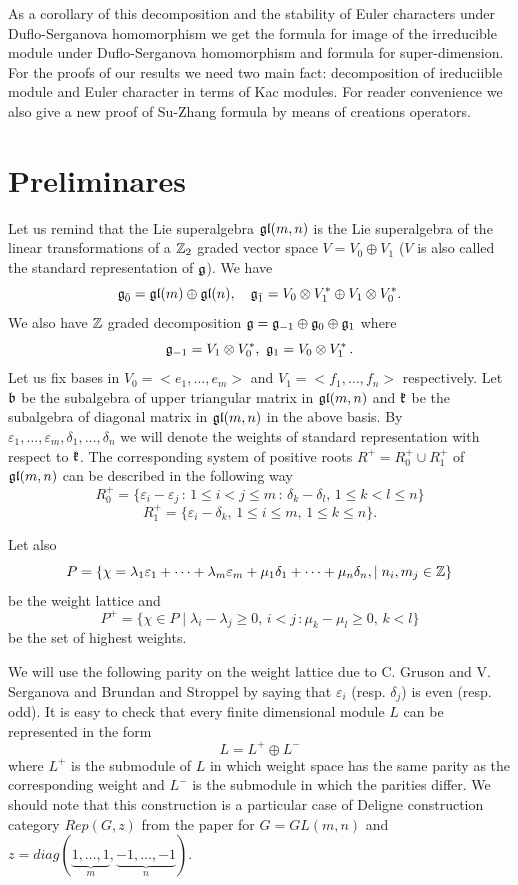 \documentclass[12pt,reqno]{amsart}
\begin{document}
 As a corollary of this decomposition  and   the stability of Euler characters under Duflo-Serganova homomorphism we  get the formula for image of the irreducible module under Duflo-Serganova homomorphism and formula for super-dimension. For the proofs of our results we need two main fact: decomposition  of ireduciible module  and Euler character in terms of Kac modules. For  reader convenience we  also give a new proof of Su-Zhang formula by means of creations operators.  
 \section{Preliminares}


Let us remind that the Lie superalgebra $\frak{gl}(m,n)$ is the Lie  superalgebra of the  linear transformations of a $\Bbb Z_2$ graded vector space $V=V_0\oplus V_1$ ($V$ is also called the standard representation of $\frak g$). We have 
$$
\frak g_{\bar0}=\frak{gl}(m)\oplus\frak{gl}(n),\quad\frak g_{\bar1}=V_0\otimes V_1^*\oplus V_1\otimes V_0^*.
$$ 
We also have $\Bbb Z$ graded decomposition 
$
\frak g=\frak g_{-1}\oplus \frak g_0\oplus \frak g_1
$
where
$$
\frak g_{-1}=V_1\otimes V^*_0,\,\, \frak g_{1}=V_0\otimes V^*_1\,.
$$
Let us fix  bases in $V_0=<e_1,\dots,e_m>$ and $V_1=<f_1,\dots,f_n>$ respectively. 
Let  $\frak{b}$ be the subalgebra of upper triangular matrix in $\frak{gl}(m,n)$ and $\frak{k}$ be  the    subalgebra of diagonal matrix in  $\frak{gl}(m,n)$ in the above basis. By   $\varepsilon_1,\dots,\varepsilon_m,\delta_1,\dots,\delta_n$  we will denote  the weights of standard representation with respect  to $\frak k$. The corresponding system of positive roots  $R^+=R^+_0\cup R^+_1$  of $\frak{gl}(m,n)$ can  be described in the following way
$$
R^+_{0}=\{\varepsilon_i-\varepsilon_j\,:\, 1\le i< j\le m\,:\, \delta_k-\delta_l,\, 1\le k<l\le n \}
$$
$$
R_1^+=\{\varepsilon_i-\delta_k,\, 1\le i\le m,\,1\le k\le n\}.
$$

 Let also  
$$
P=\{\chi=\lambda_1\varepsilon_1+\dots+\lambda_m\varepsilon_m+\mu_1\delta_1+\dots+\mu_n\delta_n,\mid n_i,m_j\in \Bbb Z\}
$$
be the weight lattice and 
$$
P^+=\{\chi\in P\mid \lambda_i-\lambda_j\ge0,\,i<j\,:\mu_k-\mu_l\ge0,\,k<l\}
$$
be the set of highest weights.

We will use the following parity on the weight lattice due to C. Gruson  and V. Serganova \cite{GS}  and Brundan and Stroppel \cite{BS} by saying  that $\varepsilon_i$ (resp. $\delta_j$) is even (resp. odd). It is easy to check that every finite dimensional module $L$ can be represented in the form
$$
L=L^+\oplus L^{-}
$$
where $L^+$ is the submodule of $L$ in which weight space has the same parity as the corresponding weight and $L^{-}$ is the submodule in which  the parities differ.  We should note that this construction is a particular case of Deligne construction category $Rep(G,z)$ from the paper \cite{D}  for $G=GL(m,n)$ and $z=diag(\underbrace{1,\dots,1}_{m},\underbrace{-1,\dots,-1}_{n}).$
\end{document}

